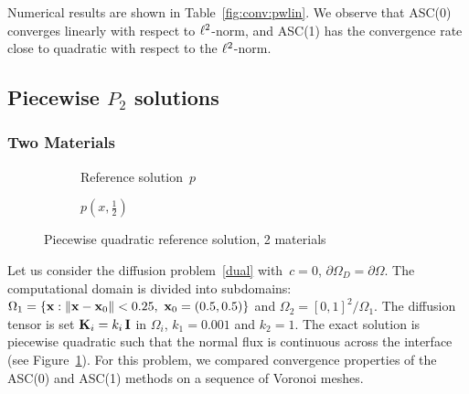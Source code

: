 	Numerical results are shown in Table~\ref{fig:conv:pwlin}. We observe that ASC(0) converges linearly with respect to ${\ell^2}$-norm, and ASC(1) has the convergence rate close to quadratic with respect to the ${\ell^2}$-norm.

	\subsection{Piecewise $P_2$ solutions}
	
	\subsubsection{Two Materials}\label{sec:twomat}

	\begin{figure}[h]
		\begin{subfigure}{.45\linewidth}
			\centering
			\caption{Reference solution~$p$}
		\end{subfigure}%
		\hfill
		\begin{subfigure}{.45\linewidth}
			\centering
			\caption{$p(x,\frac{1}{2})$}
		\end{subfigure}
		\caption{Piecewise quadratic reference solution, 2 materials\label{fig:pwquad2}}
	\end{figure}

	
	Let us consider the diffusion problem~\eqref{dual} with~$c = 0$,
        $\partial\Omega_D = \partial\Omega$. The computational domain is divided into
        subdomains: $\Omega_1 = \{ {\bf x} : \|{\bf x} - {\bf x}_0\|< 0.25,~
        {\bf x}_0 = (0.5,0.5)\}$ and  $\Omega_2 = [0,1]^2 / \Omega_1$.
        The diffusion tensor is set  $\boldsymbol{\mathbf{K}}_i = k_i\,\boldsymbol{\mathbf{I}}$ in $\Omega_i$,
        $k_1 = 0.001$ and $k_2=1$. The exact solution is piecewise quadratic such
        that the normal flux is continuous across the interface (see Figure~\ref{fig:pwquad2}).
        For this problem, we compared convergence properties of the  ASC(0) and ASC(1) methods
        on a sequence of Voronoi meshes.
	



